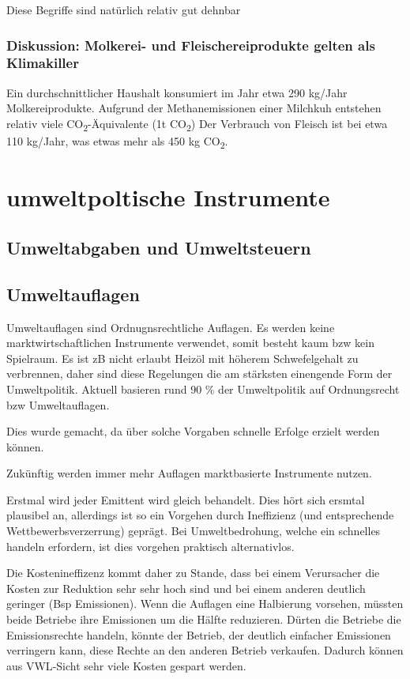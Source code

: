 \documentclass[11pt]{scrbook}
\begin{document}
Diese Begriffe sind natürlich relativ gut dehnbar


\subsubsection{Diskussion: Molkerei- und Fleischereiprodukte gelten als Klimakiller}
Ein durchschnittlicher Haushalt konsumiert im Jahr etwa 290 kg/Jahr Molkereiprodukte.
Aufgrund der Methanemissionen einer Milchkuh entstehen relativ viele  CO\textsubscript{2}-Äquivalente (1t CO\textsubscript{2})
Der Verbrauch von Fleisch ist bei etwa 110 kg/Jahr, was etwas mehr als 450 kg CO\textsubscript{2}.

\section{umweltpoltische Instrumente}

\subsection{Umweltabgaben und Umweltsteuern}



\subsection{Umweltauflagen}
Umweltauflagen sind Ordnugnsrechtliche Auflagen.
Es werden keine marktwirtschaftlichen Instrumente verwendet, somit besteht kaum bzw kein Spielraum.
Es ist zB nicht erlaubt Heizöl mit höherem Schwefelgehalt zu verbrennen, daher sind diese Regelungen die am stärksten einengende Form der Umweltpolitik.
Aktuell basieren rund 90 \% der Umweltpolitik auf Ordnungsrecht bzw Umweltauflagen.

Dies wurde gemacht, da über solche Vorgaben schnelle Erfolge erzielt werden können.

Zukünftig werden immer mehr Auflagen marktbasierte Instrumente nutzen.

Erstmal wird jeder Emittent wird gleich behandelt.
Dies hört sich ersmtal plausibel an, allerdings ist so ein Vorgehen durch Ineffizienz (und entsprechende Wettbewerbsverzerrung) geprägt.
Bei Umweltbedrohung, welche ein schnelles handeln erfordern, ist dies vorgehen praktisch alternativlos.

Die Kostenineffizenz kommt daher zu Stande, dass bei einem Verursacher die Kosten zur Reduktion sehr sehr hoch sind und bei einem anderen deutlich geringer (Bsp Emissionen).
Wenn die Auflagen eine Halbierung vorsehen, müssten beide Betriebe ihre Emissionen um die Hälfte reduzieren.
Dürten die Betriebe die Emissionsrechte handeln, könnte der Betrieb, der deutlich einfacher Emissionen verringern kann, diese Rechte an den anderen Betrieb verkaufen.
Dadurch können aus \ac{VWL}-Sicht sehr viele Kosten gespart werden.
\end{document}
